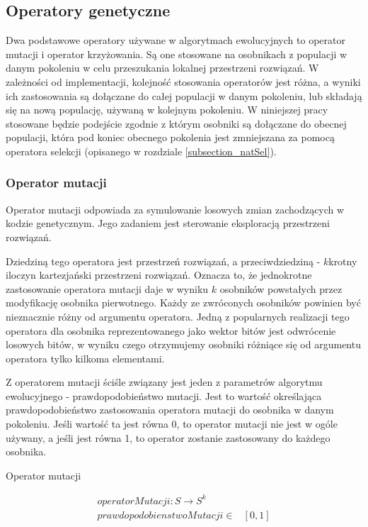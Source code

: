 \documentclass[twoside]{iisthesis}
\begin{document}
\subsection{Operatory genetyczne}

Dwa podstawowe operatory używane w algorytmach ewolucyjnych to operator mutacji i operator krzyżowania. Są one stosowane na osobnikach z populacji w danym pokoleniu w celu przeszukania lokalnej przestrzeni rozwiązań. W zależności od implementacji, kolejność stosowania operatorów jest różna, a wyniki ich zastosowania są dołączane do całej populacji w danym pokoleniu, lub składają się na nową populację, używaną w kolejnym pokoleniu. W niniejszej pracy stosowane będzie podejście zgodnie z którym osobniki są dołączane do obecnej populacji, która pod koniec obecnego pokolenia jest zmniejszana za pomocą operatora selekcji (opisanego w rozdziale \ref{subsection_natSel}).

\subsubsection{Operator mutacji}
Operator mutacji odpowiada za symulowanie losowych zmian zachodzących w kodzie genetycznym. Jego zadaniem jest sterowanie eksploracją przestrzeni rozwiązań.

Dziedziną tego operatora jest przestrzeń rozwiązań, a przeciwdziedziną - $k$krotny iloczyn kartezjański przestrzeni rozwiązań. Oznacza to, że jednokrotne zastosowanie operatora mutacji daje w wyniku $k$ osobników powstałych przez modyfikację osobnika pierwotnego. Każdy ze zwróconych osobników powinien być nieznacznie różny od argumentu operatora. Jedną z popularnych realizacji tego operatora dla osobnika reprezentowanego jako wektor bitów jest odwrócenie losowych bitów, w wyniku czego otrzymujemy osobniki różniące się od argumentu operatora tylko kilkoma elementami.

Z operatorem mutacji ściśle związany jest jeden z parametrów algorytmu ewolucyjnego - prawdopodobieństwo mutacji. Jest to wartość określająca prawdopodobieństwo zastosowania operatora mutacji do osobnika w danym pokoleniu. Jeśli wartość ta jest równa 0, to operator mutacji nie jest w ogóle używany, a jeśli jest równa 1, to operator zostanie zastosowany do każdego osobnika.

\begin{signature}
	\caption{Operator mutacji \label{signature_mutation}}
	\begin{align}
	operatorMutacji: S \rightarrow S^k \\
	prawdopodobienstwoMutacji \in &[0, 1]
	\end{align}
\end{signature}	
\end{document}
